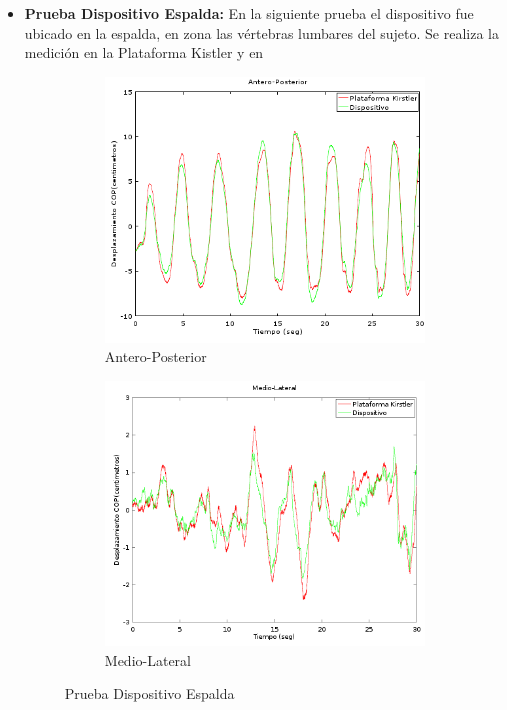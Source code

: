 \documentclass[12pt,a4paper]{article}
\begin{document}
\begin{itemize}
	\item \textbf{Prueba Dispositivo Espalda:} En la siguiente prueba el dispositivo fue ubicado en la espalda, en zona las vértebras lumbares del sujeto. Se realiza la medición en la Plataforma Kistler y en 
	
	
	\begin{figure}[H]
		\centering
		\begin{subfigure}{.5\textwidth}
			\centering
			\includegraphics[width=1\linewidth]{images/pruebas/Espalda/Antero-Posterior}
			\caption{Antero-Posterior}
			\label{fig:anteroPosteriorEspalda}
		\end{subfigure}%
		\begin{subfigure}{.5\textwidth}
			\centering
			\includegraphics[width=1\linewidth]{images/pruebas/Espalda/Medio-Lateral}
			\caption{Medio-Lateral}
			\label{fig:medioLateralEspalda}
		\end{subfigure}
		\caption{Prueba Dispositivo Espalda}
		\label{fig:pruebaEspalda}
	\end{figure}
	

\end{itemize}
\end{document}
